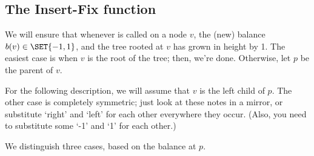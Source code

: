 \subsection{The Insert-Fix function}
We will ensure that whenever  is called on a node
$v$, the (new) balance $b(v) \in \SET{-1, 1}$, and the tree rooted at $v$
has grown in height by 1.
The easiest case is when $v$ is the root of the tree; then, we're done.
Otherwise, let $p$ be the parent of $v$. 

For the following description, we will assume that $v$ is the left
child of $p$. The other case is completely symmetric; just look at
these notes in a mirror, or substitute `right' and `left' for each
other everywhere they occur. (Also, you need to substitute some `-1'
and `1' for each other.)

We distinguish three cases, based on the balance at $p$.
